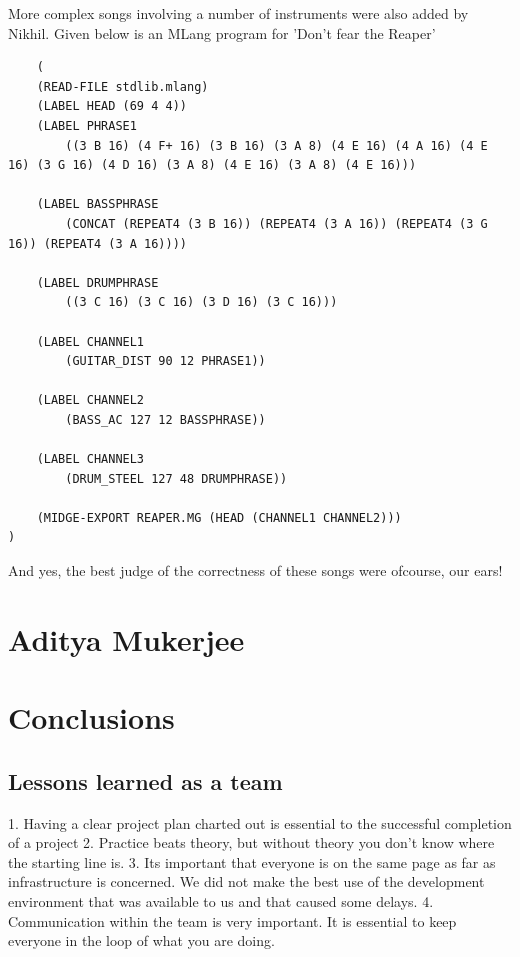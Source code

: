 \documentclass[letterpaper,11pt]{article}
\begin{document}
{\begin{lstlisting}
\end{lstlisting}
More complex songs involving a number of instruments were also added by Nikhil. Given below is an MLang program for 'Don't fear the Reaper'

\lstset{language=Lisp}
\begin{lstlisting}
	(
	(READ-FILE stdlib.mlang)
	(LABEL HEAD (69 4 4))
	(LABEL PHRASE1
		((3 B 16) (4 F+ 16) (3 B 16) (3 A 8) (4 E 16) (4 A 16) (4 E 16) (3 G 16) (4 D 16) (3 A 8) (4 E 16) (3 A 8) (4 E 16)))

	(LABEL BASSPHRASE
		(CONCAT (REPEAT4 (3 B 16)) (REPEAT4 (3 A 16)) (REPEAT4 (3 G 16)) (REPEAT4 (3 A 16))))

	(LABEL DRUMPHRASE
		((3 C 16) (3 C 16) (3 D 16) (3 C 16)))

	(LABEL CHANNEL1
		(GUITAR_DIST 90 12 PHRASE1))

	(LABEL CHANNEL2
		(BASS_AC 127 12 BASSPHRASE))

	(LABEL CHANNEL3
		(DRUM_STEEL 127 48 DRUMPHRASE))

	(MIDGE-EXPORT REAPER.MG (HEAD (CHANNEL1 CHANNEL2)))
)
\end{lstlisting}

And yes, the best judge of the correctness of these songs were ofcourse, our ears!


\section{Aditya Mukerjee}





\section{Conclusions}

\subsection{Lessons learned as a team}
1. Having a clear project plan charted out is essential to the successful completion of a project
2. Practice beats theory, but without theory you don't know where the starting line is.
3. Its important that everyone is on the same page as far as infrastructure is concerned. We did not make the best use of the development environment
that was available to us and that caused some delays.
4. Communication within the team is very important. It is essential to keep everyone in the loop of what you are doing.

}
\end{document}

